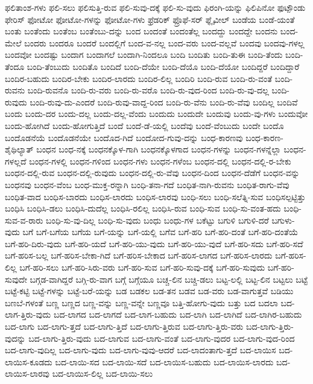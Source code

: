 {ಫಲಿತಾಂಶ-ಗಳು
ಫಲಿ-ಸಲು
ಫಲಿಸುತ್ತಿ-ರುವ
ಫಲಿ-ಸುವು-ದಕ್ಕೆ
ಫಲಿ-ಸು-ವುದು
ಫಿರಂಗಿ-ಯನ್ನು
ಫಿಲಿಪಿನೋ
ಫುಟ್ಪೌಂಡು
ಫೇರಿಸ್
ಫೋಟೋ
ಫೋಟೋ-ಗಳನ್ನು
ಫೋಟೋ-ಗಳು
ಫ್ರೆಡರಿಕ್
ಫ್ರೊಫೆ-ಸರ್
ಫ್ಲೈವೀಲ್
ಬಂಡೆಯ
ಬಂಡೆ-ಯಂತೆ
ಬಂತು
ಬಂತೆಂದು
ಬಂತೆಂಬ
ಬಂತೆಂಬು-ದನ್ನು
ಬಂದ
ಬಂದಂತೆ
ಬಂದಂತೆಲ್ಲ
ಬಂದದ್ದು
ಬಂದದ್ದೇ
ಬಂದನು
ಬಂದ-ಮೇಲೆ
ಬಂದರು
ಬಂದರೂ
ಬಂದರೆ
ಬಂದಲ್ಲಿಗೆ
ಬಂದ-ವ-ನಲ್ಲ
ಬಂದ-ವರು
ಬಂದ-ವಲ್ಲವೆ
ಬಂದವು
ಬಂದವು-ಗಳಲ್ಲ
ಬಂದವೋ
ಬಂದಷ್ಟು
ಬಂದಾಗ
ಬಂದಾಗಲೆ
ಬಂದಾಗಿ-ನಿಂದಲೂ
ಬಂದಿ
ಬಂದಿತು
ಬಂದಿ-ತುಈ
ಬಂದಿ-ತೆಂದು
ಬಂದಿ-ತೆಂದೂ
ಬಂದಿ-ತೆಂಬುದು
ಬಂದಿತೊ
ಬಂದಿದೆ
ಬಂದಿ-ದೆಯೇ
ಬಂದಿ-ದೆಯೊ
ಬಂದಿ-ದೆಯೋ
ಬಂದಿದ್ದರೆ
ಬಂದಿದ್ದಾರೆ
ಬಂದಿರ-ಬಹುದು
ಬಂದಿರ-ಬೇಕು
ಬಂದಿರ-ಲಾರದು
ಬಂದಿರ-ಲಿಲ್ಲ
ಬಂದಿರಿ
ಬಂದಿ-ರುವ
ಬಂದಿ-ರು-ವಂತೆ
ಬಂದಿ-ರುವನು
ಬಂದಿ-ರುವನೊ
ಬಂದಿ-ರು-ವರು
ಬಂದಿ-ರು-ವರೊ
ಬಂದಿ-ರು-ವುದ-ರಿಂದ
ಬಂದಿ-ರು-ವು-ದಲ್ಲ
ಬಂದಿ-ರುವುದು
ಬಂದಿ-ರುವು-ದು-ಎಂದರೆ
ಬಂದಿ-ರುವು-ವಾದ್ದ-ರಿಂದ
ಬಂದಿ-ರು-ವೆನು
ಬಂದಿ-ರು-ವೆವು
ಬಂದಿಲ್ಲ
ಬಂದಿವೆ
ಬಂದು
ಬಂದು-ದರ
ಬಂದು-ದಲ್ಲ
ಬಂದು-ದಲ್ಲ-ವೆಂದು
ಬಂದುದು
ಬಂದುದೇ
ಬಂದುವು
ಬಂದು-ವು-ಗಳು
ಬಂದುವೋ
ಬಂದು-ಹೋಗಿದೆ
ಬಂದು-ಹೋಗುತ್ತಿದೆ
ಬಂದೆ
ಬಂದೆ-ಡೆ-ಯಲ್ಲಿ
ಬಂದೆವು
ಬಂದೆ-ವೆಂಬುದು
ಬಂದೇ
ಬಂದೊ
ಬಂದೊಡನೆಯೆ
ಬಂದೊಡನೆಯೇ
ಬಂದೊದ-ಗಿದೆ
ಬಂದೋದ-ಗುವು-ದನ್ನು
ಬಂಧ-ಕಾರಣವು
ಬಂಧ-ಕಾರಣ-ಶೈಥಿಲ್ಯಾತ್
ಬಂಧನ
ಬಂಧ-ನಕ್ಕೆ
ಬಂಧನಕ್ಕೊಳ-ಗಾಗಿ
ಬಂಧನಕ್ಕೊಳಗಾದ
ಬಂಧನ-ಗಳನ್ನು
ಬಂಧನ-ಗಳನ್ನೆಲ್ಲಾ
ಬಂಧನ-ಗಳಲ್ಲದೆ
ಬಂಧನ-ಗಳಲ್ಲಿ
ಬಂಧನ-ಗಳಿಂದ
ಬಂಧನ-ಗಳು
ಬಂಧನ-ಗಳೆಂಬ
ಬಂಧನ-ದಲ್ಲಿ
ಬಂಧನ-ದಲ್ಲಿ-ರ-ಬೇಕು
ಬಂಧನ-ದಲ್ಲಿ-ರುವ
ಬಂಧನ-ದಲ್ಲಿ-ರುವುದು
ಬಂಧನ-ದಲ್ಲಿ-ರು-ವೆವು
ಬಂಧನ-ದಿಂದ
ಬಂಧನ-ದೆಡೆಗೆ
ಬಂಧನ-ವನ್ನು
ಬಂಧನವು
ಬಂಧನ-ವೆಂಬ
ಬಂಧ-ಮುಕ್ತ-ರನ್ನಾಗಿ
ಬಂಧಿ-ತನಾ-ಗದೆ
ಬಂಧಿತ-ನಾಗಿ-ರುವನು
ಬಂಧಿತ-ರಾಗು-ವೆವು
ಬಂಧಿತ-ವಾದ
ಬಂಧಿಸ-ಬಾರದು
ಬಂಧಿಸ-ಲಾರದು
ಬಂಧಿಸ-ಲಾರವು
ಬಂಧಿ-ಸಲು
ಬಂಧಿ-ಸಲೆತ್ನಿ-ಸುವ
ಬಂಧಿಸಲ್ಪಟ್ಟಿತ್ತು
ಬಂಧಿಸಿ
ಬಂಧಿಸಿ-ಡಲು
ಬಂಧಿಸಿ-ದುದೆಲ್ಲ
ಬಂಧಿಸಿ-ರಲಿಲ್ಲ
ಬಂಧಿಸಿ-ರುವ
ಬಂಧಿ-ಸುವ
ಬಂಧಿ-ಸು-ವಂತ-ಹದು
ಬಂಧಿ-ಸುವ-ವ-ರಾರು
ಬಂಧಿ-ಸು-ವು-ದಿಲ್ಲ
ಬಂಧಿ-ಸು-ವುದು
ಬಂಧು
ಬಂಧು-ಗಳ
ಬಕೆಟ್ಟು
ಬಗುಳಿ
ಬಗುಳಿ-ದರೆ
ಬಗುಳು-ವುದು
ಬಗೆ
ಬಗೆ-ಬಗೆಯ
ಬಗೆಯ
ಬಗೆ-ಯನ್ನು
ಬಗೆ-ಯಲ್ಲಿ
ಬಗೆವ
ಬಗೆ-ಹರಿ
ಬಗೆ-ಹರಿ-ದಂತೆ
ಬಗೆ-ಹರಿ-ದಂತೆಯೆ
ಬಗೆ-ಹರಿ-ದಿರು-ವುದು
ಬಗೆ-ಹರಿ-ಯದೆ
ಬಗೆ-ಹರಿ-ಯು-ವುದು
ಬಗೆ-ಹರಿ-ಯು-ವುದೆ
ಬಗೆ-ಹರಿ-ಸದು
ಬಗೆ-ಹರಿ-ಸದೆ
ಬಗೆ-ಹರಿಸ-ಬಲ್ಲ
ಬಗೆ-ಹರಿಸ-ಬೇಕಾ-ಗಿದೆ
ಬಗೆ-ಹರಿಸ-ಬೇಕಾದ
ಬಗೆ-ಹರಿಸ-ಲಾಗದ
ಬಗೆ-ಹರಿಸ-ಲಾರದು
ಬಗೆ-ಹರಿಸ-ಲಿಲ್ಲ
ಬಗೆ-ಹರಿ-ಸಲು
ಬಗೆ-ಹರಿ-ಸಿರು-ವರು
ಬಗೆ-ಹರಿ-ಸುವ
ಬಗೆ-ಹರಿ-ಸುವು-ದಕ್ಕೆ
ಬಗೆ-ಹರಿ-ಸುವುದು
ಬಗೆ-ಹರಿ-ಸುವುದೇ
ಬಗ್ಗಡ-ವಾಗಿದ್ದರೆ
ಬಗ್ಗಿ-ರು-ವಾಗ
ಬಗ್ಗೆ
ಬಗ್ಗೆಯೂ
ಬಚ್ಚ-ಲಿನ
ಬಚ್ಚಿ-ಡಲು
ಬಟ್ಟ-ಲಲ್ಲಿ
ಬಟ್ಟ-ಲಿನ
ಬಟ್ಟಲು
ಬಟ್ಟೆ
ಬಟ್ಟೆ-ಕಟ್ಟಿ
ಬಟ್ಟೆ-ಗಳನ್ನು
ಬಟ್ಟೆ-ಬರೆ-ಯನ್ನು
ಬಡ
ಬಡಕಲ
ಬಡ-ತನ
ಬಡವ
ಬಡ-ವರು
ಬಡ-ವಾಗುತ್ತವೆ
ಬಡಿಯು
ಬಣಬೆ-ಗಳಂತೆ
ಬಣ್ಣ
ಬಣ್ಣದ
ಬಣ್ಣ-ವನ್ನು
ಬಣ್ಣ-ವನ್ನೇ
ಬಣ್ಣವೂ
ಬತ್ತಿ-ಹೋಗು-ವುದು
ಬತ್ತು
ಬದ
ಬದಲಾ
ಬದ-ಲಾಗ-ತ್ತಿರು-ವುದು
ಬದ-ಲಾಗದ
ಬದ-ಲಾಗದೆ
ಬದ-ಲಾಗ-ಬಹುದು
ಬದ-ಲಾಗಿ
ಬದ-ಲಾಗಿದೆ
ಬದ-ಲಾಗಿರ-ಬಹುದು
ಬದ-ಲಾಗು
ಬದ-ಲಾಗು-ತ್ತದೆ
ಬದ-ಲಾಗು-ತ್ತಿದೆ
ಬದ-ಲಾಗು-ತ್ತಿರುವ
ಬದ-ಲಾಗು-ತ್ತಿರು-ವರು
ಬದ-ಲಾಗು-ತ್ತಿರು-ವುದನ್ನು
ಬದ-ಲಾಗು-ತ್ತಿರು-ವುದು
ಬದ-ಲಾಗುವ
ಬದ-ಲಾಗು-ವಂತೆ
ಬದ-ಲಾಗು-ವುದರ
ಬದ-ಲಾಗು-ವುದ-ರಿಂದ
ಬದ-ಲಾಗು-ವುದಿಲ್ಲ
ಬದ-ಲಾಗು-ವುದು
ಬದ-ಲಾಗು-ವುವು-ಆದರೆ
ಬದ-ಲಾದಂತಾಗು-ತ್ತದೆ
ಬದ-ಲಾಯಿಸ
ಬದ-ಲಾಯಿಸ-ಕೂಡದು
ಬದ-ಲಾಯಿ-ಸದ
ಬದ-ಲಾಯಿ-ಸದೆ
ಬದ-ಲಾಯಿಸ-ಬಹುದು
ಬದ-ಲಾಯಿಸ-ಲಾರದು
ಬದ-ಲಾಯಿಸ-ಲಾರವು
ಬದ-ಲಾಯಿಸ-ಲಿಲ್ಲ
ಬದ-ಲಾಯಿ-ಸಲು
}
